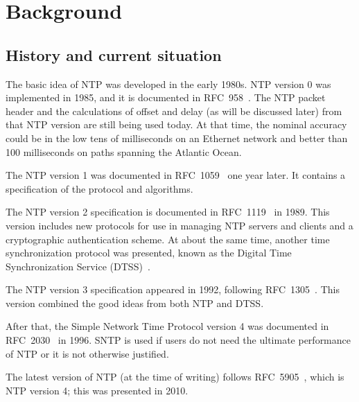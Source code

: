 
\chapter{Background}

\section{History and current situation}%
\label{sec:history_and_current_situation}
The basic idea of NTP was developed in the early 1980s. NTP version 0 was
implemented in 1985, and it is documented in RFC~958~\cite{rfc958}. 
The NTP packet header and the calculations of offset and delay (as will be
discussed later) from that NTP version are still being used today. At that
time, the nominal accuracy could be in the low tens of milliseconds on an
Ethernet network and better than 100 milliseconds on paths spanning the
Atlantic Ocean.

The NTP version 1 was documented in RFC~1059~\cite{rfc1059} one year later. It
contains a specification of the protocol and algorithms.

The NTP version 2 specification is documented in RFC~1119~\cite{rfc1119} in 1989.
This version
includes new protocols for use in managing NTP servers and clients and a
cryptographic authentication scheme.
At about the same time, another time synchronization protocol was presented,
known as the Digital Time Synchronization Service (DTSS)~\cite{DTSS}.

The NTP version 3 specification appeared in 1992, following
RFC~1305~\cite{rfc1305}. This version combined the good ideas from both NTP and
DTSS\null.

After that, the Simple Network Time Protocol version 4 was documented in
RFC~2030~\cite{rfc2030}
in 1996. SNTP is used if users do not need the ultimate performance of NTP or
it is not otherwise justified.

The latest version of NTP (at the time of writing) follows
RFC~5905~\cite{rfc5905}, which is NTP version 4; this was presented in 2010.

